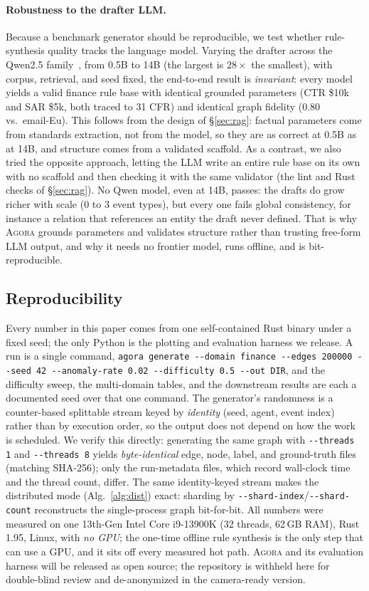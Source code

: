 \documentclass[sigconf,review,anonymous]{acmart}
\newcommand{\sys}{\textsc{Agora}\xspace}
\begin{document}
\paragraph{Robustness to the drafter LLM.}
Because a benchmark generator should be reproducible, we test whether rule-synthesis
quality tracks the language model. Varying the drafter across the Qwen2.5
family~\cite{qwen2024report}, from 0.5B to 14B (the largest is $28\times$ the smallest),
with corpus, retrieval, and seed fixed, the end-to-end result is \emph{invariant}: every
model yields a valid finance rule base with identical grounded parameters (CTR \$10k and
SAR \$5k, both traced to 31 CFR) and identical graph fidelity ($0.80$ vs.\ email-Eu).
This follows from the design of \S\ref{sec:rag}: factual parameters come from standards
extraction, not from the model, so they are as correct at 0.5B as at 14B, and structure
comes from a validated scaffold. As a contrast, we also tried the opposite approach,
letting the LLM write an entire rule base on its own with no scaffold and then checking
it with the same validator (the lint and Rust checks of \S\ref{sec:rag}). No Qwen model,
even at 14B, passes: the drafts do grow richer with scale (0 to 3 event types), but every
one fails global consistency, for instance a relation that references an entity the draft
never defined. That is why \sys{} grounds parameters and validates structure rather than
trusting free-form LLM output, and why it needs no frontier model, runs offline, and is
bit-reproducible.

\subsection{Reproducibility}
\label{sec:repro}
Every number in this paper comes from one self-contained Rust binary under a fixed
seed; the only Python is the plotting and evaluation harness we release. A run is a
single command,%
\texttt{agora generate -{}-domain finance -{}-edges 200000 -{}-seed 42
-{}-anomaly-rate 0.02 -{}-difficulty 0.5 -{}-out DIR},%
and the difficulty sweep, the multi-domain tables, and the downstream results are
each a documented seed over that one command. The generator's randomness is a
counter-based splittable stream keyed by \emph{identity} (seed, agent, event index)
rather than by execution order, so the output does not depend on how the work is
scheduled. We verify this directly: generating the same graph with
\texttt{-{}-threads 1} and \texttt{-{}-threads 8} yields \emph{byte-identical} edge,
node, label, and ground-truth files (matching SHA-256); only the run-metadata files,
which record wall-clock time and the thread count, differ. The same identity-keyed
stream makes the distributed mode (Alg.~\ref{alg:dist}) exact: sharding by
\texttt{-{}-shard-index}/\texttt{-{}-shard-count} reconstructs the single-process
graph bit-for-bit. All numbers were measured on one 13th-Gen Intel Core i9-13900K
(32 threads, 62\,GB RAM), Rust 1.95, Linux, with \emph{no GPU}; the one-time offline
rule synthesis is the only step that can use a GPU, and it sits off every measured
hot path. \sys{} and its evaluation harness will be released as open source; the
repository is withheld here for double-blind review and de-anonymized in the
camera-ready version.
\end{document}
